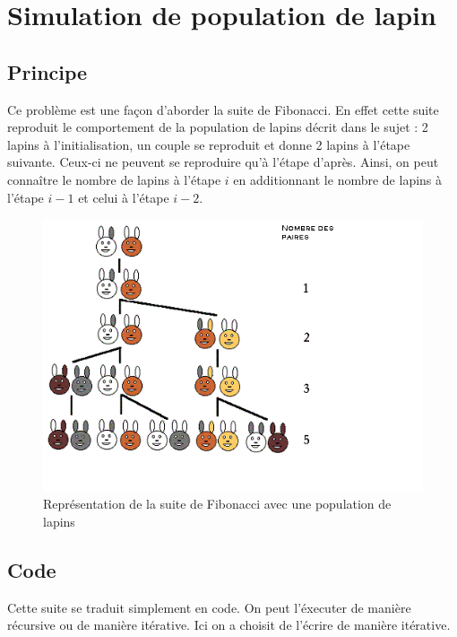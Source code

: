 \documentclass{article}
\begin{document}
\section{Simulation de population de lapin}
\subsection{Principe}
Ce problème est une façon d'aborder la suite de Fibonacci. En effet cette suite
reproduit le comportement de la population de lapins décrit dans le sujet :
2 lapins à l'initialisation, un couple se reproduit et donne 2 lapins à l'étape suivante.
Ceux-ci ne peuvent se reproduire qu'à l'étape d'après.
Ainsi, on peut connaître le nombre de lapins à l'étape $i$ en additionnant le nombre
de lapins à l'étape $i - 1$ et celui à l'étape $i - 2$.

\begin{figure}[!ht]
  \caption{Représentation de la suite de Fibonacci avec une population de lapins}
  \label{Suite de Fibonacci}
  \centering
  \includegraphics[scale=3]{images/lapins.png}
\end{figure}

\subsection{Code}
Cette suite se traduit simplement en code. On peut l'éxecuter de manière récursive
ou de manière itérative. Ici on a choisit de l'écrire de manière itérative.
\end{document}
